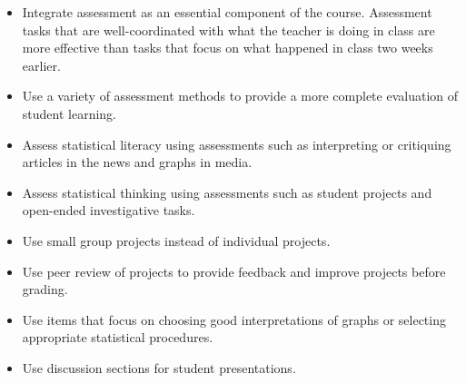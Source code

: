 \begin{itemize}[leftmargin=1cm, itemsep=.2em]
\item Integrate assessment as an essential component of the course. Assessment tasks that are well-coordinated with what the teacher is doing in class are more effective than tasks that focus on what happened in class two weeks earlier.
\item Use a variety of assessment methods to provide a more complete evaluation of student learning.
\item Assess statistical literacy using assessments such as interpreting or critiquing articles in the news and graphs in media.
\item Assess statistical thinking using assessments such as student projects and open-ended investigative tasks.
\end{itemize}
 
 \vspace{.2in}
\noindent{}
\begin{itemize}[leftmargin=1cm, itemsep=.2em]
\item Use small group projects instead of individual projects.
\item Use peer review of projects to provide feedback and improve projects before grading.
\item Use items that focus on choosing good interpretations of graphs or selecting appropriate statistical procedures.
\item Use discussion sections for student presentations.
\end{itemize}


